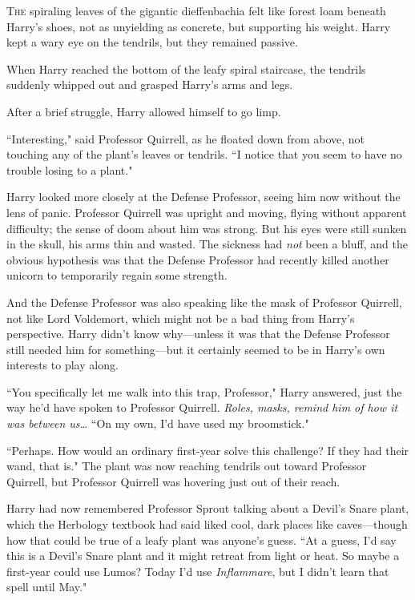 
\lettrine{T}{he} spiraling leaves of the gigantic dieffenbachia felt like forest loam beneath Harry's shoes, not as unyielding as concrete, but supporting his weight. Harry kept a wary eye on the tendrils, but they remained passive.

When Harry reached the bottom of the leafy spiral staircase, the tendrils suddenly whipped out and grasped Harry's arms and legs.

After a brief struggle, Harry allowed himself to go limp.

``Interesting," said Professor Quirrell, as he floated down from above, not touching any of the plant's leaves or tendrils. ``I notice that you seem to have no trouble losing to a plant."

Harry looked more closely at the Defense Professor, seeing him now without the lens of panic. Professor Quirrell was upright and moving, flying without apparent difficulty; the sense of doom about him was strong. But his eyes were still sunken in the skull, his arms thin and wasted. The sickness had \emph{not} been a bluff, and the obvious hypothesis was that the Defense Professor had recently killed another unicorn to temporarily regain some strength.

And the Defense Professor was also speaking like the mask of Professor Quirrell, not like Lord Voldemort, which might not be a bad thing from Harry's perspective. Harry didn't know why---unless it was that the Defense Professor still needed him for something---but it certainly seemed to be in Harry's own interests to play along.

``You specifically let me walk into this trap, Professor," Harry answered, just the way he'd have spoken to Professor Quirrell. \emph{Roles, masks, remind him of how it was between us{\ldots}} ``On my own, I'd have used my broomstick."

``Perhaps. How would an ordinary first-year solve this challenge? If they had their wand, that is." The plant was now reaching tendrils out toward Professor Quirrell, but Professor Quirrell was hovering just out of their reach.

Harry had now remembered Professor Sprout talking about a Devil's Snare plant, which the Herbology textbook had said liked cool, dark places like caves---though how that could be true of a leafy plant was anyone's guess. ``At a guess, I'd say this is a Devil's Snare plant and it might retreat from light or heat. So maybe a first-year could use Lumos? Today I'd use \emph{Inflammare}, but I didn't learn that spell until May."

